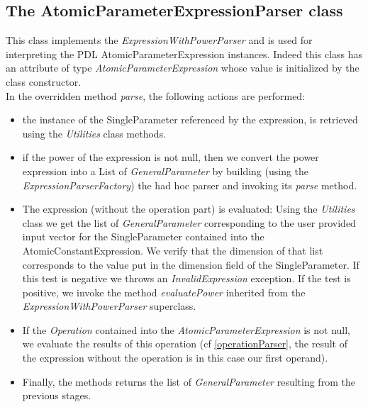 \documentclass[a4paper,11pt] {ivoa}
\begin{document}
\subsection{The AtomicParameterExpressionParser class}
This class implements the {\it ExpressionWithPowerParser} and is used for interpreting the PDL {AtomicParameterExpression} instances. Indeed this class has an attribute of type {\it AtomicParameterExpression} whose value is initialized by the class constructor.\\
In the overridden method {\it parse}, the following actions are performed:
\begin{itemize}
\item the instance of the SingleParameter referenced by the expression, is retrieved using the {\it Utilities} class methods.
\item if the power of the expression is not null, then we convert the power expression into a List of {\it GeneralParameter} by building (using the {\it ExpressionParserFactory}) the had hoc parser and invoking its {\it parse} method.
\item The expression (without the operation part) is evaluated: Using the {\it Utilities} class we get the list of {\it GeneralParameter} corresponding to the user provided input vector for the SingleParameter contained into the AtomicConstantExpression. We verify that the dimension of that list corresponds to the value put in the dimension field of the SingleParameter. If this test is negative we throws an {\it InvalidExpression} exception. If the test is positive, we invoke the method {\it evaluatePower} inherited from the {\it ExpressionWithPowerParser} superclass. 
\item If the {\it Operation} contained into the {\it AtomicParameterExpression} is not null, we evaluate the results of this operation (cf \ref{operationParser}, the result of the expression without the operation is in this case our first operand).
\item Finally, the methods returns the list of {\it GeneralParameter} resulting from the previous stages.  
\end{itemize}
\end{document}
